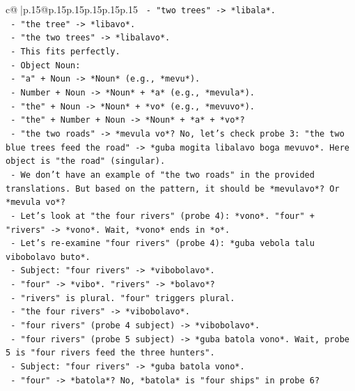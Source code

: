 \documentclass{article}
\begin{document}
{\begin{supertabular}{c@{$\;$}|p{.15\linewidth}@{}p{.15\linewidth}p{.15\linewidth}p{.15\linewidth}p{.15\linewidth}p{.15\linewidth}}
{{{\texttt{            {-} "two trees" {-}> *libala*.} \\
\texttt{            {-} "the tree" {-}> *libavo*.} \\
\texttt{            {-} "the two trees" {-}> *libalavo*.} \\
\texttt{            {-} This fits perfectly.} \\
\texttt{        {-} Object Noun:} \\
\texttt{          {-} "a" + Noun {-}> *Noun* (e.g., *mevu*).} \\
\texttt{          {-} Number + Noun {-}> *Noun* + *a* (e.g., *mevula*).} \\
\texttt{          {-} "the" + Noun {-}> *Noun* + *vo* (e.g., *mevuvo*).} \\
\texttt{          {-} "the" + Number + Noun {-}> *Noun* + *a* + *vo*?} \\
\texttt{            {-} "the two roads" {-}> *mevula vo*? No, let's check probe 3: "the two blue trees feed the road" {-}> *guba mogita libalavo boga mevuvo*. Here object is "the road" (singular).} \\
\texttt{            {-} We don't have an example of "the two roads" in the provided translations. But based on the pattern, it should be *mevulavo*? Or *mevula vo*?} \\
\texttt{            {-} Let's look at "the four rivers" (probe 4): *vono*. "four" + "rivers" {-}> *vono*. Wait, *vono* ends in *o*.} \\
\texttt{            {-} Let's re{-}examine "four rivers" (probe 4): *guba vebola talu vibobolavo buto*.} \\
\texttt{              {-} Subject: "four rivers" {-}> *vibobolavo*.} \\
\texttt{              {-} "four" {-}> *vibo*. "rivers" {-}> *bolavo*?} \\
\texttt{              {-} "rivers" is plural. "four" triggers plural.} \\
\texttt{              {-} "the four rivers" {-}> *vibobolavo*.} \\
\texttt{              {-} "four rivers" (probe 4 subject) {-}> *vibobolavo*.} \\
\texttt{              {-} "four rivers" (probe 5 subject) {-}> *guba batola vono*. Wait, probe 5 is "four rivers feed the three hunters".} \\
\texttt{                {-} Subject: "four rivers" {-}> *guba batola vono*.} \\
\texttt{                {-} "four" {-}> *batola*? No, *batola* is "four ships" in probe 6?} \\
}}}
\end{supertabular}}
\end{document}
